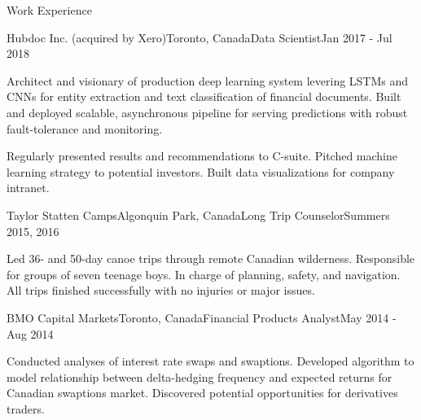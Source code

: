 \documentclass{resume} %
\begin{document}
\begin{rSection}{Work Experience}
\begin{rSubsection}{Hubdoc Inc. (acquired by Xero)}{Toronto, Canada}{Data Scientist}{Jan 2017 - Jul 2018}
\item
    Architect and visionary of production deep learning system levering LSTMs and CNNs for entity extraction and text classification of financial documents.
    Built and deployed scalable, asynchronous pipeline for serving predictions with robust fault-tolerance and monitoring.

\item
    Regularly presented results and recommendations to C-suite.
    Pitched machine learning strategy to potential investors.
    Built data visualizations for company intranet.
    
\end{rSubsection}


\begin{rSubsection}{Taylor Statten Camps}{Algonquin Park, Canada}{Long Trip Counselor}{Summers 2015, 2016}

\item
    Led 36- and 50-day canoe trips through remote Canadian wilderness. Responsible for groups of seven teenage boys. In charge of planning, 
    safety, and navigation. All trips finished successfully with no injuries or major issues.

\end{rSubsection}


\begin{rSubsection}{BMO Capital Markets}{Toronto, Canada}{Financial Products Analyst}{May 2014 - Aug 2014}

\item
    Conducted analyses of interest rate swaps and swaptions.
    Developed algorithm to model relationship between delta-hedging frequency and expected returns for Canadian swaptions market.
    Discovered potential opportunities for derivatives traders.

\end{rSubsection}


\end{rSection}

\end{document}
